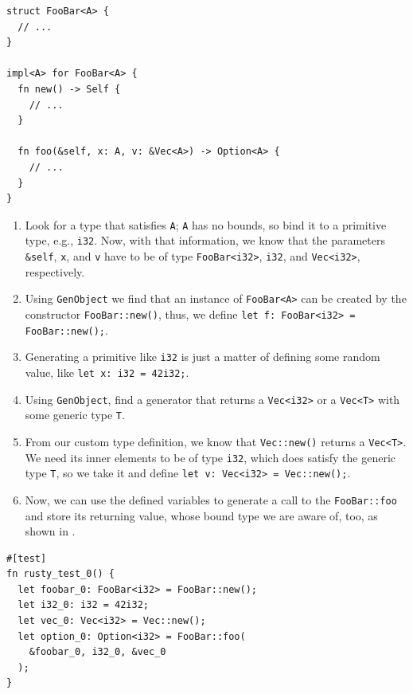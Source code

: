 \documentclass[paper=a4,%
  twoside,%
  BCOR4mm,%
  abstract=true,%
  toc=bibliography,%
  chapterprefix=true,%
  toc=bibliographynumbered,%
  open=right,%
  english,%
  pagesize=pdftex]{scrreprt}
\begin{document}
\begin{lstlisting}[style=boxed, caption={A generic type A is used in multiple parameters and return value}, label=lst:generic-type-used-in-multiple-params]
struct FooBar<A> { 
  // ...
}

impl<A> for FooBar<A> {
  fn new() -> Self {
    // ...
  }

  fn foo(&self, x: A, v: &Vec<A>) -> Option<A> {
    // ...
  }
}
\end{lstlisting}

\begin{enumerate}
    \item Look for a type that satisfies \texttt{A}; \texttt{A} has no bounds, so bind it to a primitive type, e.g., \texttt{i32}. Now, with that information, we know that the parameters \texttt{\string&self}, \texttt{x}, and \texttt{v} have to be of type \texttt{FooBar<i32>}, \texttt{i32}, and \texttt{Vec<i32>}, respectively.
    \item Using \texttt{GenObject} we find that an instance of \texttt{FooBar<A>} can be created by the constructor \texttt{FooBar::new()}, thus, we define \texttt{let f: FooBar<i32> = FooBar::new();}.
    \item Generating a primitive like \texttt{i32} is just a matter of defining some random value, like \texttt{let x: i32 = 42i32;}.
    \item Using \texttt{GenObject}, find a generator that returns a \texttt{Vec<i32>} or a \texttt{Vec<T>} with some generic type \texttt{T}.
    \item From our custom type definition, we know that \texttt{Vec::new()} returns a \texttt{Vec<T>}. We need its inner elements to be of type \texttt{i32}, which does satisfy the generic type \texttt{T}, so we take it and define \texttt{let v: Vec<i32> = Vec::new();}.
    \item Now, we can use the defined variables to generate a call to the \texttt{FooBar::foo} and store its returning value, whose bound type we are aware of, too, as shown in .
\end{enumerate}

\begin{lstlisting}[style=boxed, caption={An example test that invokes \texttt{FooBar::foo}}, label=lst:example-generated-test]
#[test]
fn rusty_test_0() {
  let foobar_0: FooBar<i32> = FooBar::new();
  let i32_0: i32 = 42i32;
  let vec_0: Vec<i32> = Vec::new();
  let option_0: Option<i32> = FooBar::foo(
    &foobar_0, i32_0, &vec_0
  );
}
\end{lstlisting}
\end{document}
